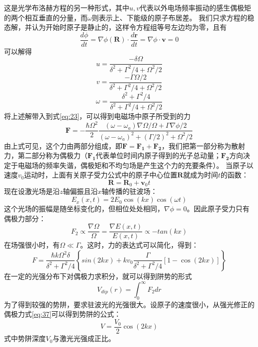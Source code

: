 \documentclass{article}
\begin{document}
	这是光学布洛赫方程的另一种形式，其中$u,v$代表以外电场频率振动的感生偶极矩的两个相互垂直的分量，而$\omega$则表示上、下能级的原子布居差。
	我们只求方程的稳态解，并认为开始时原子是静止的，这样令方程组等号左边均为零，且有
	\begin{equation}
		\frac{d\phi}{dt} = \nabla \phi(\boldsymbol{R}) \cdot \frac{d\boldsymbol{r}}{dt} = \nabla \phi \cdot \boldsymbol{v} = 0
	\end{equation}
	可以解得
	\begin{equation}
		u = \frac{-\delta \Omega}{\delta^2 + \Gamma^2/4 + \Omega^2/2}
	\end{equation}
	\begin{equation}
		v = \frac{-\Gamma \Omega/2}{\delta^2 + \Gamma^2/4 + \Omega^2/2}
	\end{equation}
	\begin{equation}
		\omega = \frac{\delta^2 + \Gamma^2/4}{\delta^2 + \Gamma^2/4 + \Omega^2/2}
	\end{equation}
	将上述解带入到式\ref{eq:23}，可以得到电磁场中原子所受到的力
	\begin{equation}
		\boldsymbol{F} = - \frac{\hbar \Omega^2}{2} \frac{(\omega - \omega_a) \nabla \Omega/\Omega + \Gamma \nabla \phi/2}{(\omega - \omega_a)^2 + (\Gamma/2)^2 + \Omega^2/2}
	\end{equation}
	由上式可见，这个力由两部分组成，即$\boldsymbol{F} = \boldsymbol{F_1} + \boldsymbol{F_2}$，我们把第一部分称为散射力，第二部分称为偶极力（$\boldsymbol{F_1}$代表单位时间内原子得到的光子总动量；$\boldsymbol{F_2}$方向决定于电磁场的频率失谐，偶极矩和不均匀场是产生这个力的充要条件）。
	当原子以速度$v_0$运动时，上面有关原子受力公式中的原子中心位置$\boldsymbol{R}$就成为时间$t$的函数：
	\begin{equation}
		\boldsymbol{R} = \boldsymbol{R}_0 + \boldsymbol{v}_0t
	\end{equation}
	现在设激光场是沿$z$轴偏振且沿$x$轴传播的驻波场：
	\begin{equation}
		E_x(x,t) = 2E_0\cos(kx)\cos(\omega t)
	\end{equation}
	这个光场的振幅是随坐标变化的，但相位处处相同，$\nabla \phi = 0$。因此原子受力只有偶极力部分：
	\begin{equation}
		F_2 \propto \frac{\nabla \Omega}{\Omega} = \frac{\nabla E(x,t)}{E(x,t)} \propto -tan(kx)
	\end{equation}
	在场强很小时，有$\Omega \ll \Gamma$。这时，力的表达式可以简化，得到：
	\begin{equation}
		F = \frac{\hbar k \Omega^2 \delta}{\delta^2 + \Gamma^2/4} \left\{ sin(2kx) + kv_0 \frac{\Gamma}{\delta^2 + \Gamma^2/4}[1-\cos(2kx)] \right\} \label{eq:37}
	\end{equation}
	在一定的光强分布下对偶极力求积分，就可以得到阱势的形式
	\begin{equation}
		V_{dip}(r) = \int_0^{\infty} F_2 dr
	\end{equation}
	为了得到较强的势阱，要求驻波光的光强很大。设原子的速度很小，从强光修正的偶极力式\ref{eq:37}可以得到势阱的公式：
	\begin{equation}
		V = \frac{V_0}{2} \cos(2kx)
	\end{equation}
	式中势阱深度$V_0$与激光光强成正比。
\end{document}

